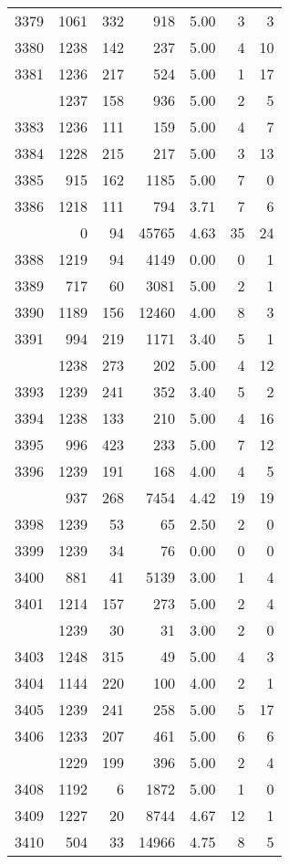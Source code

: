 \documentclass[
]{article}
\begin{document}
\begin{table}
\begin{tabular}[t]{lrrrrrr}
3379 & 1061 & 332 & 918 & 5.00 & 3 & 3\\
3380 & 1238 & 142 & 237 & 5.00 & 4 & 10\\
3381 & 1236 & 217 & 524 & 5.00 & 1 & 17\\
\addlinespace
3382 & 1237 & 158 & 936 & 5.00 & 2 & 5\\
3383 & 1236 & 111 & 159 & 5.00 & 4 & 7\\
3384 & 1228 & 215 & 217 & 5.00 & 3 & 13\\
3385 & 915 & 162 & 1185 & 5.00 & 7 & 0\\
3386 & 1218 & 111 & 794 & 3.71 & 7 & 6\\
\addlinespace
3387 & 0 & 94 & 45765 & 4.63 & 35 & 24\\
3388 & 1219 & 94 & 4149 & 0.00 & 0 & 1\\
3389 & 717 & 60 & 3081 & 5.00 & 2 & 1\\
3390 & 1189 & 156 & 12460 & 4.00 & 8 & 3\\
3391 & 994 & 219 & 1171 & 3.40 & 5 & 1\\
\addlinespace
3392 & 1238 & 273 & 202 & 5.00 & 4 & 12\\
3393 & 1239 & 241 & 352 & 3.40 & 5 & 2\\
3394 & 1238 & 133 & 210 & 5.00 & 4 & 16\\
3395 & 996 & 423 & 233 & 5.00 & 7 & 12\\
3396 & 1239 & 191 & 168 & 4.00 & 4 & 5\\
\addlinespace
3397 & 937 & 268 & 7454 & 4.42 & 19 & 19\\
3398 & 1239 & 53 & 65 & 2.50 & 2 & 0\\
3399 & 1239 & 34 & 76 & 0.00 & 0 & 0\\
3400 & 881 & 41 & 5139 & 3.00 & 1 & 4\\
3401 & 1214 & 157 & 273 & 5.00 & 2 & 4\\
\addlinespace
3402 & 1239 & 30 & 31 & 3.00 & 2 & 0\\
3403 & 1248 & 315 & 49 & 5.00 & 4 & 3\\
3404 & 1144 & 220 & 100 & 4.00 & 2 & 1\\
3405 & 1239 & 241 & 258 & 5.00 & 5 & 17\\
3406 & 1233 & 207 & 461 & 5.00 & 6 & 6\\
\addlinespace
3407 & 1229 & 199 & 396 & 5.00 & 2 & 4\\
3408 & 1192 & 6 & 1872 & 5.00 & 1 & 0\\
3409 & 1227 & 20 & 8744 & 4.67 & 12 & 1\\
3410 & 504 & 33 & 14966 & 4.75 & 8 & 5\\

\end{tabular}
\end{table}
\end{document}
